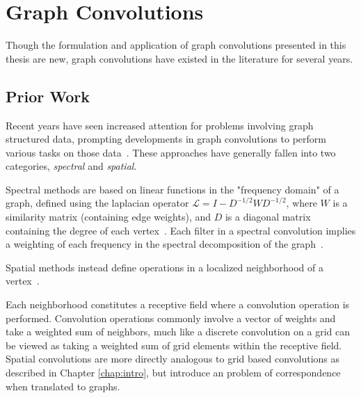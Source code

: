 \section{Graph Convolutions}
Though the formulation and application of graph convolutions presented in this thesis are new, graph convolutions have existed in the literature for several years.


\subsection{Prior Work}
Recent years have seen increased attention for problems involving graph structured data, prompting developments in graph convolutions to perform various tasks on those data~\cite{bronstein2016}.
These approaches have generally fallen into two categories, \textit{spectral} and \textit{spatial}.

Spectral methods are based on linear functions in the "frequency domain" of a graph, defined using the laplacian operator $\mathcal{L}=I-D^{-1/2}WD^{-1/2}$, where $W$ is a similarity matrix (containing edge weights), and $D$ is a diagonal matrix containing the degree of each vertex~\cite{bruna2013}\cite{henaff2015}\cite{kipf2016}.
Each filter in a spectral convolution implies a weighting of each frequency in the spectral decomposition of the graph~\cite{mallat2009}.

Spatial methods instead define operations in a localized neighborhood of a vertex~\cite{henaff2015}\cite{atwood2016diffusion}.

Each neighborhood constitutes a receptive field where a convolution operation is performed. 
Convolution operations commonly involve a vector of weights and take a weighted sum of neighbors, much like a discrete convolution on a grid can be viewed as taking a weighted sum of grid elements within the receptive field.
Spatial convolutions are more directly analogous to grid based convolutions as described in Chapter \ref{chap:intro}, but introduce an problem of correspondence when translated to graphs.

